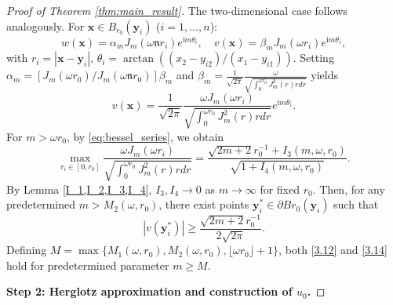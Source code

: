 \documentclass[11pt,reqno,oneside]{amsart}
\numberwithin{equation}{section}
\theoremstyle{definition}
\theoremstyle{remark}
\numberwithin{equation}{section}
\begin{document}
\begin{proof}[Proof of Theorem \ref{thm:main_result}]
		\item[\textbf{Case 2}: $d=2.$] The two-dimensional case follows analogously. For $\mathbf{x} \in B_{r_0}(\mathbf{y}_i)$ ($i=1,\dots,n$):
		\begin{equation*}
			w(\mathbf{x}) = \alpha_m J_m(\omega \mathfrak{n} r_i) e^{\mathrm{i}m \theta_i}, \quad
			v(\mathbf{x}) = \beta_m J_m(\omega r_i) e^{\mathrm{i}m \theta_i},
		\end{equation*}
		with $r_i = |\mathbf{x}-\mathbf{y}_i|$, $\theta_i = \arctan((x_2-y_{i2})/(x_1-y_{i1}))$. Setting $\alpha_m = [J_m(\omega r_0)/J_m(\omega \mathfrak{n} r_0)] \beta_m$ and $	\beta _m=\frac{1}{\sqrt{2\pi}}\frac{\omega}{\sqrt{ \int_{0}^{\omega r_0}J^2_m(r)rdr}}$  yields 
		\begin{equation}
			v(\mathbf{x}) = \frac{1}{\sqrt{2\pi}} \frac{\omega J_m(\omega r_i)}{\sqrt{\int_{0}^{\omega r_0} J_{m}^2(r) r  dr}} e^{\mathrm{i}m \theta_i}.
		\end{equation}
		For $m > \omega r_0$, by \eqref{eq:bessel_series}, we obtain
		\begin{equation*}
			\max_{r_i \in [0,r_0]} \frac{\omega J_m(\omega r_i)}{\sqrt{\int_{0}^{\omega r_0} J_{m}^2(r) r  dr}} = \frac{\sqrt{2m+2} r^{-1}_0 + I_3(m,\omega,r_0)}{\sqrt{1 + I_4(m,\omega,r_0)}}.
		\end{equation*}
		By Lemma \ref{I_1,I_2,I_3,I_4}, $I_3, I_4 \to 0$ as $m \to \infty$ for fixed $r_0$. Then, for any predetermined $m > M_2(\omega, r_0)$, there exist points $\mathbf{y}^{*}_{i} \in \partial B{r_0}(\mathbf{y}_i)$ such that
		\begin{equation}\label{3.14}
			|v(\mathbf{y}^*_i)| \geqslant \frac{\sqrt{2m+2} r^{-1}_0}{2\sqrt{2\pi}}.
		\end{equation}
		Defining $M = \max\{M_1(\omega,r_0), M_2(\omega,r_0), \lfloor \omega r_0 \rfloor + 1\}$, both \eqref{3.12} and \eqref{3.14} hold for predetermined parameter $m \geqslant M$.
		
		
		\medskip
		\textbf{Step 2: Herglotz approximation and construction of $u_0$.}
		

\end{proof}
\end{document}
